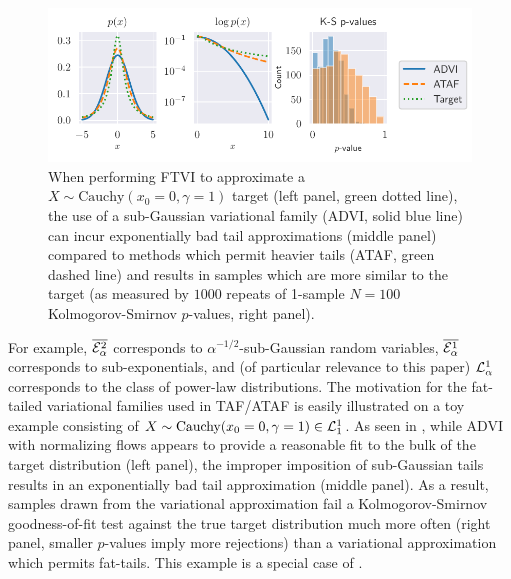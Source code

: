 \documentclass{article}
\theoremstyle{definition}
\theoremstyle{remark}
\begin{document}
\begin{figure}[htbp]
  \centering
  \includegraphics{../Figures/fat_tail_ks.pdf}
  \vspace{-6mm}
  \caption{
    When performing FTVI to approximate a $X \sim \text{Cauchy}(x_0 = 0, \gamma = 1)$ target (left panel, green dotted line),
    the use of a sub-Gaussian variational family (ADVI, solid blue line) can incur
    exponentially bad tail approximations (middle panel) compared to
    methods which permit heavier tails (ATAF, green dashed line) and results in
    samples which are more similar to the target (as measured by $1000$ repeats of
    1-sample $N=100$ Kolmogorov-Smirnov $p$-values, right panel).
  }
  \label{fig:cauchy_normal_student}
\end{figure}

For example, $\overline{\mathcal{E}_\alpha^2}$ corresponds to $\alpha^{-1/2}$-sub-Gaussian random variables,
    $\overline{\mathcal{E}_\alpha^1}$ corresponds to sub-exponentials, and (of particular relevance to this paper) $\mathcal{L}^1_\alpha$ corresponds to the class of power-law distributions.
The motivation for the fat-tailed variational families used in TAF/ATAF
is easily illustrated on a toy example consisting of $X \sim \text{Cauchy}(x_0 = 0, \gamma = 1) \in \mathcal{L}^1_1$.
As seen in , while ADVI with normalizing flows \citep{kingma2016improved,webb2019improving}
appears to provide a reasonable fit to the bulk of the target distribution (left panel), the improper
imposition of sub-Gaussian tails results in an exponentially bad tail approximation (middle panel).
As a result, samples drawn from the variational approximation fail a Kolmogorov-Smirnov goodness-of-fit
test against the true target distribution much more often (right panel, smaller $p$-values imply more rejections)
than a variational approximation which permits fat-tails. This example is a special case of .
\end{document}
